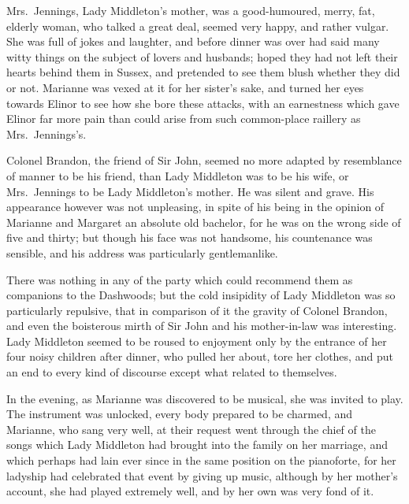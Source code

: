 \documentclass{article}
\begin{document}
Mrs.\ Jennings, Lady Middleton's mother, was a
good-humoured, merry, fat, elderly woman, who talked a
great deal, seemed very happy, and rather vulgar.  She was full
of jokes and laughter, and before dinner was over had said
many witty things on the subject of lovers and husbands;
hoped they had not left their hearts behind them in Sussex,
and pretended to see them blush whether they did or not.
Marianne was vexed at it for her sister's sake, and turned
her eyes towards Elinor to see how she bore these attacks,
with an earnestness which gave Elinor far more pain than
could arise from such common-place raillery as Mrs.\ Jennings's.

Colonel Brandon, the friend of Sir John, seemed no
more adapted by resemblance of manner to be his friend,
than Lady Middleton was to be his wife, or Mrs.\ Jennings
to be Lady Middleton's mother.  He was silent and grave.
His appearance however was not unpleasing, in spite
of his being in the opinion of Marianne and Margaret
an absolute old bachelor, for he was on the wrong side
of five and thirty; but though his face was not handsome,
his countenance was sensible, and his address was
particularly gentlemanlike.

There was nothing in any of the party which could
recommend them as companions to the Dashwoods; but the cold
insipidity of Lady Middleton was so particularly repulsive,
that in comparison of it the gravity of Colonel Brandon,
and even the boisterous mirth of Sir John and his
mother-in-law was interesting.  Lady Middleton seemed
to be roused to enjoyment only by the entrance of her
four noisy children after dinner, who pulled her about,
tore her clothes, and put an end to every kind of discourse
except what related to themselves.

In the evening, as Marianne was discovered to be musical,
she was invited to play.  The instrument was unlocked,
every body prepared to be charmed, and Marianne,
who sang very well, at their request went through the
chief of the songs which Lady Middleton had brought into
the family on her marriage, and which perhaps had lain
ever since in the same position on the pianoforte,
for her ladyship had celebrated that event by giving
up music, although by her mother's account, she had
played extremely well, and by her own was very fond of it.
\end{document}

